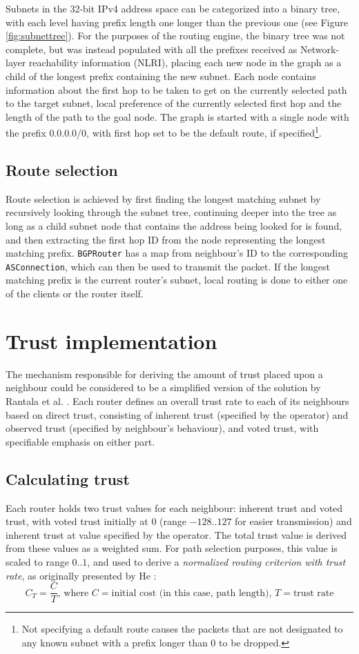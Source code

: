 \documentclass[11pt,a4paper,titlepage]{report}
\begin{document}
Subnets in the 32-bit IPv4 address space can be categorized into a binary tree, with each level having prefix length one longer than the previous one (see Figure \ref{fig:subnettree}). For the purposes of the routing engine, the binary tree was not complete, but was instead populated with all the prefixes received as Network-layer reachability information (NLRI), placing each new node in the graph as a child of the longest prefix containing the new subnet. Each node contains information about the first hop to be taken to get on the currently selected path to the target subnet, local preference of the currently selected first hop and the length of the path to the goal node. The graph is started with a single node with the prefix 0.0.0.0/0, with first hop set to be the default route, if specified\footnote{Not specifying a default route causes the packets that are not designated to any known subnet with a prefix longer than 0 to be dropped.}.

\subsection{Route selection}
Route selection is achieved by first finding the longest matching subnet by recursively looking through the subnet tree, continuing deeper into the tree as long as a child subnet node that contains the address being looked for is found, and then extracting the first hop ID from the node representing the longest matching prefix. \texttt{BGPRouter} has a map from neighbour's ID to the corresponding \texttt{ASConnection}, which can then be used to transmit the packet. If the longest matching prefix is the current router's subnet, local routing is done to either one of the clients or the router itself.

\section{Trust implementation}\label{sec:trust}
The mechanism responsible for deriving the amount of trust placed upon a neighbour could be considered to be a simplified version of the solution by Rantala et al. \cite{DBLP:journals/corr/abs-1105-5518}. Each router defines an overall trust rate to each of its neighbours based on direct trust, consisting of inherent trust (specified by the operator) and observed trust (specified by neighbour's behaviour), and voted trust, with specifiable emphasis on either part.

\subsection{Calculating trust}\label{ssec:trustcalc}
Each router holds two trust values for each neighbour: inherent trust and voted trust, with voted trust initially at 0 (range $-128..127$ for easier transmission) and inherent trust at value specified by the operator. The total trust value is derived from these values as a weighted sum. For path selection purposes, this value is scaled to range $0..1$, and used to derive a \emph{normalized routing criterion with trust rate}, as originally presented by He \cite{1690485}:
\[
C_T=\frac{C}{T} \text{, where } C=\text{initial cost (in this case, path length), } T=\text{trust rate}
\]
\end{document}
